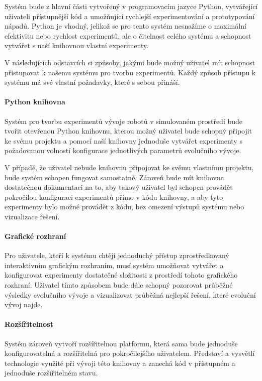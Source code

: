 Systém bude z hlavní části vytvořený v programovacím jazyce Python, vytvářející
uživateli přístupnější kód a umožňující rychlejší experimentování a
prototypování nápadů. Python je vhodný, jelikož se pro tento systém nesnažíme o
maximální efektivitu nebo rychlost experimentů, ale o čitelnost celého systému
a schopnost vytvářet s naší knihovnou vlastní experimenty.

V následujících odstavcích si způsoby, jakými bude možný uživatel mít schopnost
přistupovat k našemu systému pro tvorbu experimentů. Každý způsob přístupu k
systému má své vlastní požadavky, které s sebou přináší. 

\paragraph{Python knihovna}
Systém pro tvorbu experimentů vývoje robotů v simulovaném prostředí bude tvořit
otevřenou Python knihovnu, kterou možný uživatel bude schopný připojit ke svému
projektu a pomocí naší knihovny jednoduše vytvářet experimenty s požadovanou
volností konfigurace jednotlivých parametrů evolučního vývoje.

V případě, že uživatel nebude knihovnu připojovat ke svému vlastnímu projektu,
bude systém schopen fungovat samostatně. Zároveň bude mít knihovna dostatečnou
dokumentaci na to, aby takový uživatel byl schopen provádět pokročilou
konfiguraci experimentů přímo v kódu knihovny, a aby tyto experimenty bylo
možné provádět z kódu, bez omezení výstupů systému nebo vizualizace řešení.

\paragraph{Grafické rozhraní}
Pro uživatele, kteří k systému chtějí jednoduchý přístup zprostředkovaný
interaktivním grafickým rozhraním, musí systém umožňovat vytvářet a
konfigurovat experimenty dostatečné složitosti z prostředí tohoto grafického
rozhraní. Uživatel tímto způsobem bude dále schopný pozorovat průběžné výsledky
evolučního vývoje a vizualizovat průběžná nejlepší řešení, které evoluční vývoj
najde.

\paragraph{Rozšířitelnost}
Systém zároveň vytvoří rozšířitelnou platformu, která sama bude jednoduše
konfigurovatelná a rozšířitelná pro pokročilejšího uživatelem. Představí
a vysvětlí technologie využité při vývoji této knihovny a zanechá kód v
přístupném a jednoduše rozšířitelném stavu.
